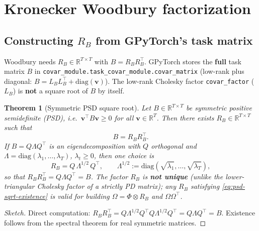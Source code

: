 \documentclass[11pt]{article}
\theoremstyle{plain}
\newtheorem{theorem}{Theorem}
\newcommand{\Ph}{\Phi}
\newcommand{\Om}{\Omega}
\newcommand{\LB}{L_B}
\newcommand{\RB}{R_B}
\begin{document}
\section{Kronecker Woodbury factorization}

\subsection{Constructing $\RB$ from GPyTorch's task matrix}
\label{sec:rb-construction}

Woodbury needs $\RB \in \mathbb{R}^{T \times T}$ with $B = \RB\RB^\top$.
GPyTorch stores the \textbf{full} task matrix $B$ in
\texttt{covar\_module.task\_covar\_module.covar\_matrix} (low-rank plus diagonal:
$B = \LB\LB^\top + \mathrm{diag}(\mathbf{v})$).
The low-rank Cholesky factor \texttt{covar\_factor} ($\LB$) is \textbf{not} a square root of $B$ by itself.

\begin{theorem}[Symmetric PSD square root]
\label{thm:psd-square-root}
Let $B \in \mathbb{R}^{T \times T}$ be symmetric positive semidefinite (PSD), i.e.\
$\mathbf{v}^\top B \mathbf{v} \ge 0$ for all $\mathbf{v} \in \mathbb{R}^T$.
Then there exists $\RB \in \mathbb{R}^{T \times T}$ such that
\begin{equation}
  \label{eq:psd-sqrt-existence}
  B = \RB \RB^\top.
\end{equation}
If $B = Q \Lambda Q^\top$ is an eigendecomposition with $Q$ orthogonal and
$\Lambda = \mathrm{diag}(\lambda_1,\ldots,\lambda_T)$, $\lambda_t \ge 0$, then one choice is
\begin{equation}
  \label{eq:psd-sqrt-construct}
  \RB = Q\,\Lambda^{1/2}\,Q^\top,
  \qquad
  \Lambda^{1/2} := \mathrm{diag}(\sqrt{\lambda_1},\ldots,\sqrt{\lambda_T}),
\end{equation}
so that $\RB\RB^\top = Q\Lambda Q^\top = B$.
The factor $\RB$ is \textbf{not unique} (unlike the lower-triangular Cholesky factor of a strictly
PD matrix); any $\RB$ satisfying \eqref{eq:psd-sqrt-existence} is valid for building
$\Om = \Ph \otimes \RB$ and $\Om\Om^\top$.
\end{theorem}

\begin{proof}[Sketch]
Direct computation: $\RB\RB^\top = Q\Lambda^{1/2}Q^\top Q\Lambda^{1/2}Q^\top = Q\Lambda Q^\top = B$.
Existence follows from the spectral theorem for real symmetric matrices.
\end{proof}
\end{document}
